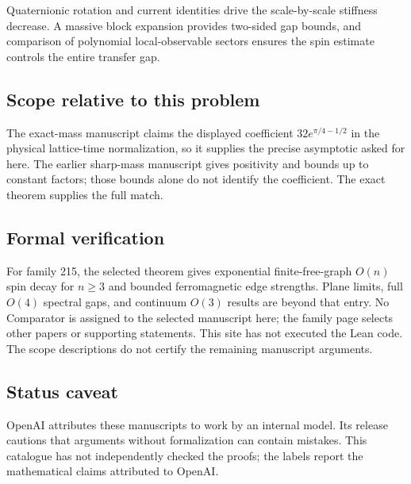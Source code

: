 \documentclass[11pt]{article}
\begin{document}
Quaternionic rotation and current identities drive the scale-by-scale stiffness decrease. A massive block expansion provides two-sided gap bounds, and comparison of polynomial local-observable sectors ensures the spin estimate controls the entire transfer gap.

\subsection{Scope relative to this problem}
The exact-mass manuscript claims the displayed coefficient $32e^{\pi/4-1/2}$ in the physical lattice-time normalization, so it supplies the precise asymptotic asked for here. The earlier sharp-mass manuscript gives positivity and bounds up to constant factors; those bounds alone do not identify the coefficient. The exact theorem supplies the full match.

\subsection{Formal verification}
For family 215, the selected theorem gives exponential finite-free-graph $O(n)$ spin decay for $n\geq3$ and bounded ferromagnetic edge strengths. Plane limits, full $O(4)$ spectral gaps, and continuum $O(3)$ results are beyond that entry. No Comparator is assigned to the selected manuscript here; the family page selects other papers or supporting statements. This site has not executed the Lean code. The scope descriptions do not certify the remaining manuscript arguments.

\subsection{Status caveat}
OpenAI attributes these manuscripts to work by an internal model. Its release cautions that arguments without formalization can contain mistakes. This catalogue has not independently checked the proofs; the labels report the mathematical claims attributed to OpenAI.
\end{document}

